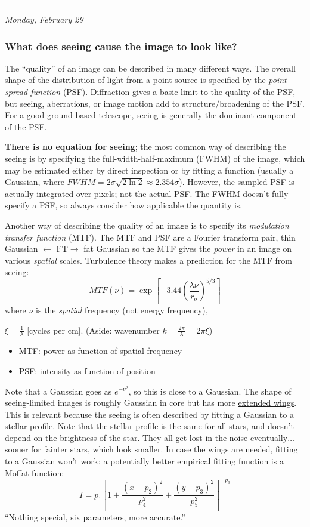 \documentclass[12pt]{article}
\newcommand{\mynotes}[1]{\textcolor{myBlue}{#1}}
\newcommand{\mydate}[1]{
    \begin{flushright}
        \rule{\textwidth}{0.4pt} %
        \footnotesize\hfill\textit{#1}
    \end{flushright}}
\begin{document}
\mydate{Monday, February 29}
\subsubsection{What does seeing cause the image to look like?}
The ``quality'' of an image can be described in many different ways. The
overall shape of the distribution of light from a point source is specified by
the \textit{point spread function} (PSF). Diffraction gives a basic limit to
the quality of the PSF, but seeing, aberrations, or image motion add to
structure/broadening of the PSF\@. For a good ground-based telescope, seeing is
generally the dominant component of the PSF.

\textbf{There is no equation for seeing};
the most common way of describing the seeing is by specifying the
full-width-half-maximum (FWHM) of the image, which may be estimated either by
direct inspection or by fitting a function (usually a Gaussian, where $FWHM =
2\sigma\sqrt{2\ln{2}} \approx 2.354\sigma$). However, the sampled PSF is actually
integrated over pixels; not the actual PSF\@. The FWHM doesn't fully specify a PSF, so
always consider how applicable the quantity is.

Another way of describing the quality of an image is to specify its
\textit{modulation transfer function} (MTF). The MTF and PSF are a Fourier
transform pair, \mynotes{thin Gaussian $\leftarrow$\small
FT\normalsize$\rightarrow$ fat Gaussian} so the MTF gives the \textit{power} in
an image on various \textit{spatial} scales. Turbulence theory makes a
prediction for the MTF from seeing:
\[
    MTF(\nu)
    = \exp \left[ -3.44 \left( \frac{\lambda\nu}{r_{o}} \right) ^{5/3} \right]
    \]
where $\nu$ is the \emph{spatial} frequency (not energy frequency),
\mynotes{$\xi = \frac{1}{\lambda}$ [cycles per cm].
(Aside: wavenumber $k = \frac{2\pi}{\lambda} = 2\pi\xi$)
\begin{itemize}
    \item MTF: power as function of spatial frequency
    \item PSF: intensity as function of position
\end{itemize}}

Note that a Gaussian goes as $e^{-\nu^{2}}$, so this is close to a Gaussian.
The shape of seeing-limited images is roughly Gaussian in core but has more
\href{http://astronomy.nmsu.edu/holtz/a535/html/diagrams/a535/racine2.htm}
{extended wings}. This is relevant because the seeing is often described by
fitting a Gaussian to a stellar profile. \mynotes{Note that the stellar profile
is the same for all stars, and doesn't depend on the brightness of the star.
They all get lost in the noise eventually$\ldots$ sooner for fainter stars,
which look smaller. In case the wings are needed, fitting to a Gaussian won't
work;} a potentially better empirical fitting
function is a \href{http://astronomy.nmsu.edu/holtz/a535/html/diagrams/a535/racine3.htm}
{Moffat function}:
\[
    I = p_{1} \left[
        1 + \frac{ \left( x-p_{2} \right) ^{2}}{p_{4}^{2}} +
        \frac{ \left( y-p_{3} \right) ^{2}}{p_{5}^{2}} \right] ^{-p_{6}}
    \]
``Nothing special, six parameters, more accurate.''
\end{document}
